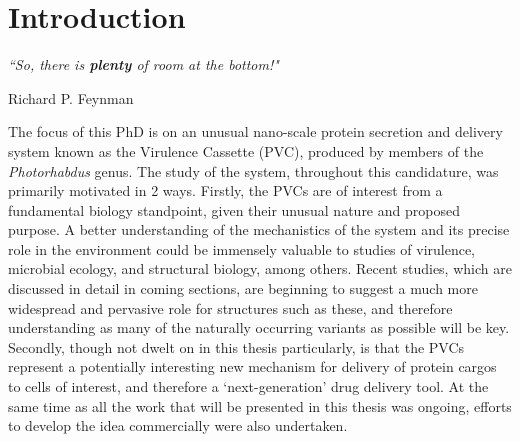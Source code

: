 \chapter{Introduction}\label{intro}

\pagestyle{IHA-fancy-style}


\epigraph{\textit{``So, there is \textbf{plenty} of room at the bottom!"}}{Richard P. Feynman}

The focus of this PhD is on an unusual nano-scale protein secretion and delivery system known as the \Pa{} Virulence Cassette (PVC), produced by members of the \emph{Photorhabdus} genus. The study of the system, throughout this candidature, was primarily motivated in 2 ways. Firstly, the PVCs are of interest from a fundamental biology standpoint, given their unusual nature and proposed purpose. A better understanding of the mechanistics of the system and its precise role in the environment could be immensely valuable to studies of virulence, microbial ecology, and structural biology, among others. Recent studies, which are discussed in detail in coming sections, are beginning to suggest a much more widespread and pervasive role for structures such as these, and therefore understanding as many of the naturally occurring variants as possible will be key. Secondly, though not dwelt on in this thesis particularly, is that the PVCs represent a potentially interesting new mechanism for delivery of protein cargos to cells of interest, and therefore a `next-generation' drug delivery tool. At the same time as all the work that will be presented in this thesis was ongoing, efforts to develop the idea commercially were also undertaken.



